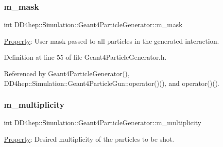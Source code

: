 \hypertarget{class_d_d4hep_1_1_simulation_1_1_geant4_particle_generator_a725064da51fefbd1410e0d0e5292d6c8}{}\label{class_d_d4hep_1_1_simulation_1_1_geant4_particle_generator_a725064da51fefbd1410e0d0e5292d6c8} 
\subsubsection{\texorpdfstring{m\+\_\+mask}{m\_mask}}
{\footnotesize\ttfamily int D\+D4hep\+::\+Simulation\+::\+Geant4\+Particle\+Generator\+::m\+\_\+mask\hspace{0.3cm}{\ttfamily [protected]}}



\hyperlink{class_d_d4hep_1_1_property}{Property}\+: User mask passed to all particles in the generated interaction. 



Definition at line 55 of file Geant4\+Particle\+Generator.\+h.



Referenced by Geant4\+Particle\+Generator(), D\+D4hep\+::\+Simulation\+::\+Geant4\+Particle\+Gun\+::operator()(), and operator()().

\hypertarget{class_d_d4hep_1_1_simulation_1_1_geant4_particle_generator_a366bf41f1de7a3e605ec7f2ecc220b39}{}\label{class_d_d4hep_1_1_simulation_1_1_geant4_particle_generator_a366bf41f1de7a3e605ec7f2ecc220b39} 
\subsubsection{\texorpdfstring{m\+\_\+multiplicity}{m\_multiplicity}}
{\footnotesize\ttfamily int D\+D4hep\+::\+Simulation\+::\+Geant4\+Particle\+Generator\+::m\+\_\+multiplicity\hspace{0.3cm}{\ttfamily [protected]}}



\hyperlink{class_d_d4hep_1_1_property}{Property}\+: Desired multiplicity of the particles to be shot. 



